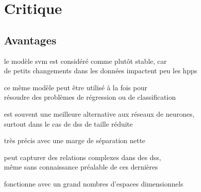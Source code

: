 \section{Critique}


\subsection{Avantages}


\begin{itmz}

\item{le modèle \gls{svm} est considéré comme plutôt stable, car\\
de petits changements dans les données impactent peu les \glspl{hpp}}

\end{itmz}\begin{itmz}

\item{ce même modèle peut être utilisé à la fois pour\\
résoudre des problèmes de régression ou de classification}

\end{itmz}\begin{itmz}

\item{est souvent une meilleure alternative aux réseaux de neurones,\\
surtout dans le cas de \glspl{ds} de taille réduite}

\end{itmz}\begin{itmz}

\item{très précis avec une marge de séparation nette}

\end{itmz}\begin{itmz}

\item{peut capturer des relations complexes dans des \glspl{ds},\\
même sans connaissance préalable de ces dernières}

\end{itmz}\begin{itmz}

\item{fonctionne avec un grand nombres d’espaces dimensionnels}

\end{itmz}\begin{itmz}


\end{itmz}
